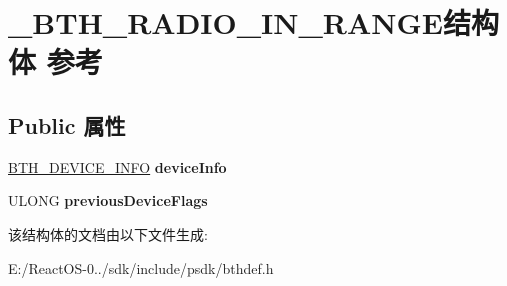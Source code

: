 \hypertarget{struct___b_t_h___r_a_d_i_o___i_n___r_a_n_g_e}{}\section{\+\_\+\+B\+T\+H\+\_\+\+R\+A\+D\+I\+O\+\_\+\+I\+N\+\_\+\+R\+A\+N\+G\+E结构体 参考}
\label{struct___b_t_h___r_a_d_i_o___i_n___r_a_n_g_e}
\subsection*{Public 属性}
\begin{DoxyCompactItemize}
\item 
\mbox{\label{struct___b_t_h___r_a_d_i_o___i_n___r_a_n_g_e_a2dba5633f024541b9661f370abf1c053}} 
\hyperlink{struct___b_t_h___d_e_v_i_c_e___i_n_f_o}{B\+T\+H\+\_\+\+D\+E\+V\+I\+C\+E\+\_\+\+I\+N\+FO} {\bfseries device\+Info}
\item 
\mbox{\label{struct___b_t_h___r_a_d_i_o___i_n___r_a_n_g_e_ac5a08ffefb72e8621d8e7c0da820c619}} 
U\+L\+O\+NG {\bfseries previous\+Device\+Flags}
\end{DoxyCompactItemize}


该结构体的文档由以下文件生成\+:\begin{DoxyCompactItemize}
\item 
E\+:/\+React\+O\+S-\/0../sdk/include/psdk/bthdef.\+h\end{DoxyCompactItemize}
